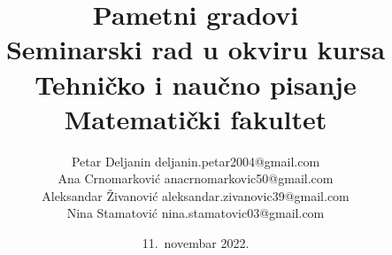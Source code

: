 \documentclass[a4paper,12pt]{article}
\begin{document}
\title{\vspace{-8em}Pametni gradovi\\ \small{Seminarski rad u okviru kursa\\Tehničko i naučno pisanje\\ Matematički fakultet}}

\author{\hspace{0,9cm}Petar Deljanin \hspace{3,1cm}deljanin.petar2004@gmail.com\\ \hspace{0,2cm}Ana Crnomarković \hspace{3,2cm}anacrnomarkovic50@gmail.com\\ \hspace{0,3cm}Aleksandar Živanović \hspace{3cm}aleksandar.zivanovic39@gmail.com\\ \hspace{0,3cm}Nina Stamatović \hspace{3,2cm}nina.stamatovic03@gmail.com}
\date{11.~novembar 2022.}
\maketitle
\end{document}
